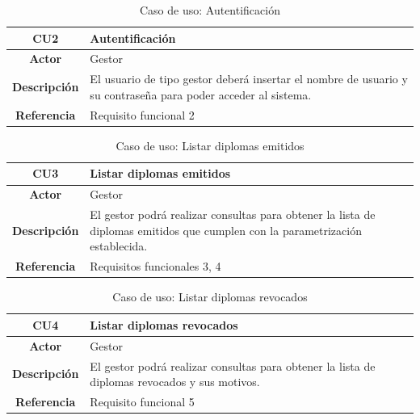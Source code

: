 \begin{table}[!h]
	\begin{center}
		\begin{tabular}{|c|p{10cm}|}
		\hline \textbf{CU2} & Autentificación \\ 
		\hline \textbf{Actor} & Gestor\\ 
		\hline \textbf{Descripción} & El usuario de tipo gestor deberá insertar el nombre de usuario y su contraseña para poder acceder al sistema.\\ 
		\hline \textbf{Referencia} & Requisito funcional 2 \\ 
		\hline 
		\end{tabular}
		\caption{Caso de uso: Autentificación}
		\label{tab:CU2}
	\end{center}
\end{table}

\begin{table}[!h]
	\begin{center}
		\begin{tabular}{|c|p{10cm}|}
		\hline \textbf{CU3} & Listar diplomas emitidos \\ 
		\hline \textbf{Actor} & Gestor\\ 
		\hline \textbf{Descripción} & El gestor podrá realizar consultas para obtener la lista de diplomas emitidos que cumplen con la parametrización establecida. \\ 
		\hline \textbf{Referencia} & Requisitos funcionales 3, 4 \\ 
		\hline 
		\end{tabular}
		\caption{Caso de uso: Listar diplomas emitidos}
		\label{tab:CU3}
	\end{center}
\end{table}

\begin{table}[!h]
	\begin{center}
		\begin{tabular}{|c|p{10cm}|}
		\hline \textbf{CU4} & Listar diplomas revocados \\ 
		\hline \textbf{Actor} & Gestor\\ 
		\hline \textbf{Descripción} & El gestor podrá realizar consultas para obtener la lista de diplomas revocados y sus motivos. \\ 
		\hline \textbf{Referencia} & Requisito funcional 5 \\ 
		\hline 
		\end{tabular}
		\caption{Caso de uso: Listar diplomas revocados}
		\label{tab:CU4}
	\end{center}
\end{table}

